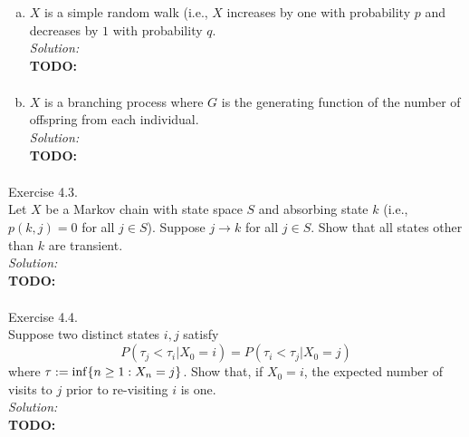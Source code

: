 \documentclass[10pt]{amsart}
\begin{document}
\begin{enumerate}[(a)]
\item $X$ is a simple random walk (i.e., $X$ increases by one with probability $p$ and decreases by $1$ with probability $q$. \\

\noindent
\textit{Solution:} \\
\textbf{TODO:} \\
\begin{align*}
\end{align*}
\item $X$ is a branching process where $G$ is the generating function of the number of offspring from each individual. \\

\noindent
\textit{Solution:} \\
\textbf{TODO:} \\
\begin{align*}
\end{align*}

\end{enumerate}

\newpage


 Exercise 4.3. \\
Let $X$ be a Markov chain with state space $S$ and absorbing state $k$ (i.e., $p(k, j) = 0$ for all $j \in S$).
Suppose $j \rightarrow k$ for all $j \in S$.
Show that all states other than $k$ are transient. \\

\noindent
\textit{Solution:} \\
\textbf{TODO:} \\
\begin{align*}
\end{align*}

\newpage


  Exercise 4.4. \\
Suppose two distinct states $i, j$ satisfy
$$
P(\tau_j < \tau_i | X_0 = i) = P(\tau_i < \tau_j | X_0 = j)
$$
where $\tau := {\rm inf}\{n \geq 1: X_n = j\}$.
Show that, if $X_0 = i$, the expected number of visits to $j$ prior to re-visiting $i$ is one. \\

\noindent
\textit{Solution:} \\
\textbf{TODO:} \\
\begin{align*}
\end{align*}
\end{document}
